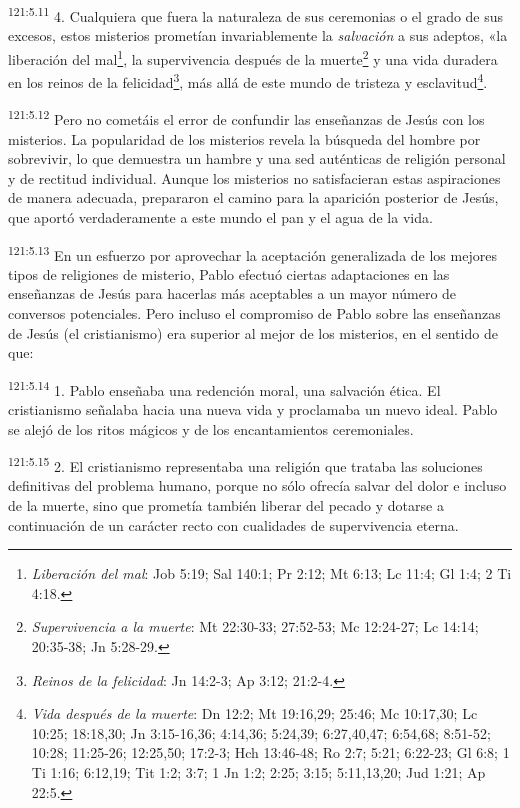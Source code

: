 \par 
\textsuperscript{121:5.11} 4. Cualquiera que fuera la naturaleza de sus ceremonias o el grado de sus excesos, estos misterios prometían invariablemente la \textit{salvación} a sus adeptos, «la liberación del mal\footnote{\textit{Liberación del mal}: Job 5:19; Sal 140:1; Pr 2:12; Mt 6:13; Lc 11:4; Gl 1:4; 2 Ti 4:18.}, la supervivencia después de la muerte\footnote{\textit{Supervivencia a la muerte}: Mt 22:30-33; 27:52-53; Mc 12:24-27; Lc 14:14; 20:35-38; Jn 5:28-29.} y una vida duradera en los reinos de la felicidad\footnote{\textit{Reinos de la felicidad}: Jn 14:2-3; Ap 3:12; 21:2-4.}, más allá de este mundo de tristeza y esclavitud\footnote{\textit{Vida después de la muerte}: Dn 12:2; Mt 19:16,29; 25:46; Mc 10:17,30; Lc 10:25; 18:18,30; Jn 3:15-16,36; 4:14,36; 5:24,39; 6:27,40,47; 6:54,68; 8:51-52; 10:28; 11:25-26; 12:25,50; 17:2-3; Hch 13:46-48; Ro 2:7; 5:21; 6:22-23; Gl 6:8; 1 Ti 1:16; 6:12,19; Tit 1:2; 3:7; 1 Jn 1:2; 2:25; 3:15; 5:11,13,20; Jud 1:21; Ap 22:5.}.

\par 
\textsuperscript{121:5.12} Pero no cometáis el error de confundir las enseñanzas de Jesús con los misterios. La popularidad de los misterios revela la búsqueda del hombre por sobrevivir, lo que demuestra un hambre y una sed auténticas de religión personal y de rectitud individual. Aunque los misterios no satisfacieran estas aspiraciones de manera adecuada, prepararon el camino para la aparición posterior de Jesús, que aportó verdaderamente a este mundo el pan y el agua de la vida.

\par 
\textsuperscript{121:5.13} En un esfuerzo por aprovechar la aceptación generalizada de los mejores tipos de religiones de misterio, Pablo efectuó ciertas adaptaciones en las enseñanzas de Jesús para hacerlas más aceptables a un mayor número de conversos potenciales. Pero incluso el compromiso de Pablo sobre las enseñanzas de Jesús (el cristianismo) era superior al mejor de los misterios, en el sentido de que:

\par 
\textsuperscript{121:5.14} 1. Pablo enseñaba una redención moral, una salvación ética. El cristianismo señalaba hacia una nueva vida y proclamaba un nuevo ideal. Pablo se alejó de los ritos mágicos y de los encantamientos ceremoniales.

\par 
\textsuperscript{121:5.15} 2. El cristianismo representaba una religión que trataba las soluciones definitivas del problema humano, porque no sólo ofrecía salvar del dolor e incluso de la muerte, sino que prometía también liberar del pecado y dotarse a continuación de un carácter recto con cualidades de supervivencia eterna.

